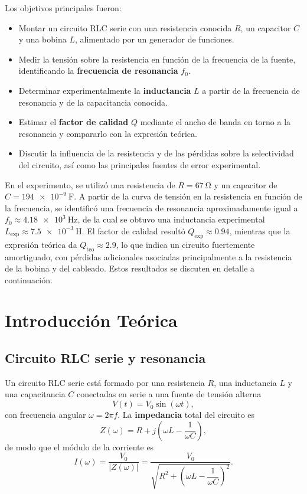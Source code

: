 \documentclass[a4paper,12pt]{article}
\begin{document}
Los objetivos principales fueron:
\begin{itemize}
    \item Montar un circuito RLC serie con una resistencia conocida \( R \), un capacitor \( C \) y una bobina \( L \), alimentado por un generador de funciones.
    \item Medir la tensión sobre la resistencia en función de la frecuencia de la fuente, identificando la \textbf{frecuencia de resonancia} \( f_0 \).
    \item Determinar experimentalmente la \textbf{inductancia} \( L \) a partir de la frecuencia de resonancia y de la capacitancia conocida.
    \item Estimar el \textbf{factor de calidad} \( Q \) mediante el ancho de banda en torno a la resonancia y compararlo con la expresión teórica.
    \item Discutir la influencia de la resistencia y de las pérdidas sobre la selectividad del circuito, así como las principales fuentes de error experimental.
\end{itemize}

En el experimento, se utilizó una resistencia de \( R = \SI{67}{\ohm} \) y un capacitor de \( C = \SI{194e-9}{\farad} \). A partir de la curva de tensión en la resistencia en función de la frecuencia, se identificó una frecuencia de resonancia aproximadamente igual a \( f_0 \approx \SI{4.18e3}{\hertz} \), de la cual se obtuvo una inductancia experimental \( L_{\text{exp}} \approx \SI{7.5e-3}{\henry} \). El factor de calidad resultó \( Q_{\text{exp}} \approx 0.94 \), mientras que la expresión teórica da \( Q_{\text{teo}} \approx 2.9 \), lo que indica un circuito fuertemente amortiguado, con pérdidas adicionales asociadas principalmente a la resistencia de la bobina y del cableado. Estos resultados se discuten en detalle a continuación.

\section{Introducción Teórica}
\subsection{Circuito RLC serie y resonancia}
Un circuito RLC serie está formado por una resistencia \( R \), una inductancia \( L \) y una capacitancia \( C \) conectadas en serie a una fuente de tensión alterna
\[
V(t) = V_0 \sin(\omega t),
\]
con frecuencia angular \( \omega = 2\pi f \). La \textbf{impedancia} total del circuito es
\[
Z(\omega) = R + j\left(\omega L - \frac{1}{\omega C}\right),
\]
de modo que el módulo de la corriente es
\[
I(\omega) = \frac{V_0}{\lvert Z(\omega)\rvert}
          = \frac{V_0}{\sqrt{R^2 + \left(\omega L - \dfrac{1}{\omega C}\right)^2}}.
\]
\end{document}
